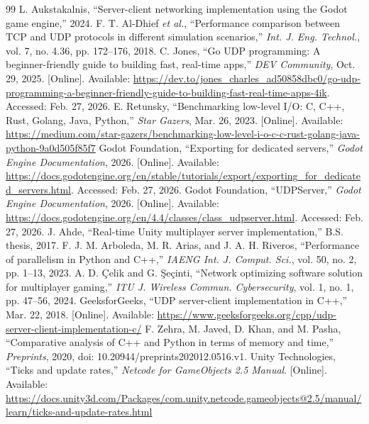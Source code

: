 \documentclass[11pt]{article}
\begin{document}
\begin{thebibliography}{99}
 L. Aukstakalnis, ``Server-client networking implementation using the Godot game engine,'' 2024.
 F. T. Al-Dhief \emph{et al.}, ``Performance comparison between TCP and UDP protocols in different simulation scenarios,'' \emph{Int. J. Eng. Technol.}, vol. 7, no. 4.36, pp. 172--176, 2018.
 C. Jones, ``Go UDP programming: A beginner-friendly guide to building fast, real-time apps,'' \emph{DEV Community}, Oct. 29, 2025. [Online]. Available: \url{https://dev.to/jones_charles_ad50858dbc0/go-udp-programming-a-beginner-friendly-guide-to-building-fast-real-time-apps-4ik}. Accessed: Feb. 27, 2026.
 E. Retunsky, ``Benchmarking low-level I/O: C, C++, Rust, Golang, Java, Python,'' \emph{Star Gazers}, Mar. 26, 2023. [Online]. Available: \url{https://medium.com/star-gazers/benchmarking-low-level-i-o-c-c-rust-golang-java-python-9a0d505f85f7}
 Godot Foundation, ``Exporting for dedicated servers,'' \emph{Godot Engine Documentation}, 2026. [Online]. Available: \url{https://docs.godotengine.org/en/stable/tutorials/export/exporting_for_dedicated_servers.html}. Accessed: Feb. 27, 2026.
 Godot Foundation, ``UDPServer,'' \emph{Godot Engine Documentation}, 2026. [Online]. Available: \url{https://docs.godotengine.org/en/4.4/classes/class_udpserver.html}. Accessed: Feb. 27, 2026.
 J. Ahde, ``Real-time Unity multiplayer server implementation,'' B.S. thesis, 2017.
 F. J. M. Arboleda, M. R. Arias, and J. A. H. Riveros, ``Performance of parallelism in Python and C++,'' \emph{IAENG Int. J. Comput. Sci.}, vol. 50, no. 2, pp. 1--13, 2023.
 A. D. \c{C}elik and G. \c{S}e\c{c}inti, ``Network optimizing software solution for multiplayer gaming,'' \emph{ITU J. Wireless Commun. Cybersecurity}, vol. 1, no. 1, pp. 47--56, 2024.
 GeeksforGeeks, ``UDP server-client implementation in C++,'' Mar. 22, 2018. [Online]. Available: \url{https://www.geeksforgeeks.org/cpp/udp-server-client-implementation-c/}
 F. Zehra, M. Javed, D. Khan, and M. Pasha, ``Comparative analysis of C++ and Python in terms of memory and time,'' \emph{Preprints}, 2020, doi: 10.20944/preprints202012.0516.v1.
 Unity Technologies, ``Ticks and update rates,'' \emph{Netcode for GameObjects 2.5 Manual}. [Online]. Available: \url{https://docs.unity3d.com/Packages/com.unity.netcode.gameobjects@2.5/manual/learn/ticks-and-update-rates.html}

\end{thebibliography}
\end{document}
